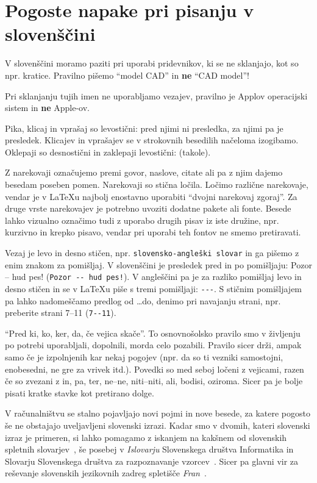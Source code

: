 \chapter{Pogoste napake pri pisanju v slovenščini}
\label{slo}

V slovenščini moramo paziti  pri uporabi pridevnikov, ki se ne sklanjajo, kot so npr. kratice.
Pravilno pišemo ``model CAD'' in \textbf{ne} ``CAD model''!

Pri sklanjanju tujih imen ne uporabljamo vezajev, pravilno je Applov operacijski sistem in
\textbf{ne} Apple-ov.

Pika, klicaj in vprašaj so levostični: pred njimi ni presledka, za njimi pa je presledek.
Klicajev in vprašajev se v strokovnih besedilih načeloma izogibamo.
Oklepaji so desnostični in zaklepaji levostični: (takole).

Z narekovaji označujemo premi govor, naslove, citate ali pa z njim dajemo besedam poseben pomen.
Narekovaji so stična ločila.
Ločimo različne narekovaje, vendar je v \LaTeX u najbolj enostavno uporabiti ``dvojni narekovaj zgoraj''.
Za druge vrste narekovajev je potrebno uvoziti dodatne pakete ali fonte.
Besede lahko vizualno označimo tudi z uporabo drugih pisav  iz iste družine, npr. kurzivno in
krepko pisavo, vendar pri uporabi teh fontov ne smemo pretiravati.

Vezaj je levo in desno stičen, npr. \verb=slovensko-angleški slovar= in ga pišemo z enim znakom za pomišljaj.
V slovenščini je presledek pred in po pomišljaju: Pozor -- hud pes! (\verb=Pozor -- hud pes!=).
V angleščini pa je za razliko pomišljaj levo in desno stičen in se v \LaTeX u piše s tremi
pomišljaji: \verb=---=.
S stičnim pomišljajem pa lahko nadomeščamo predlog od \dots do, denimo pri navajanju strani,
npr. preberite strani 7--11 (\verb=7--11=).

``Pred ki, ko, ker, da, če vejica skače''.
To osnovnošolsko pravilo smo v življenju po potrebi uporabljali, dopolnili, morda celo pozabili.
Pravilo sicer drži, ampak samo če je izpolnjenih kar nekaj pogojev (npr. da so ti vezniki
samostojni, enobesedni, ne gre za vrivek itd.).
Povedki so med seboj ločeni z vejicami, razen če so zvezani z in, pa, ter, ne–ne, niti–niti,
ali, bodisi, oziroma.
Sicer pa je bolje pisati kratke stavke kot pretirano dolge.

V računalništvu se stalno pojavljajo novi pojmi in nove besede, za katere pogosto še ne obstajajo
uveljavljeni slovenski izrazi.
Kadar smo v dvomih, kateri slovenski izraz je primeren, si lahko pomagamo z iskanjem na kakšnem
od slovenskih spletnih slovarjev~\cite{slovarji}, še posebej v \textit{Islovarju} Slovenskega
društva Informatika \cite{Islovar} in Slovarju Slovenskega društva za razpoznavanje vzorcev~\cite{sdrv}.
Sicer pa glavni vir za reševanje slovenskih jezikovnih zadreg spletišče \textit{Fran}~\cite{fran}.
